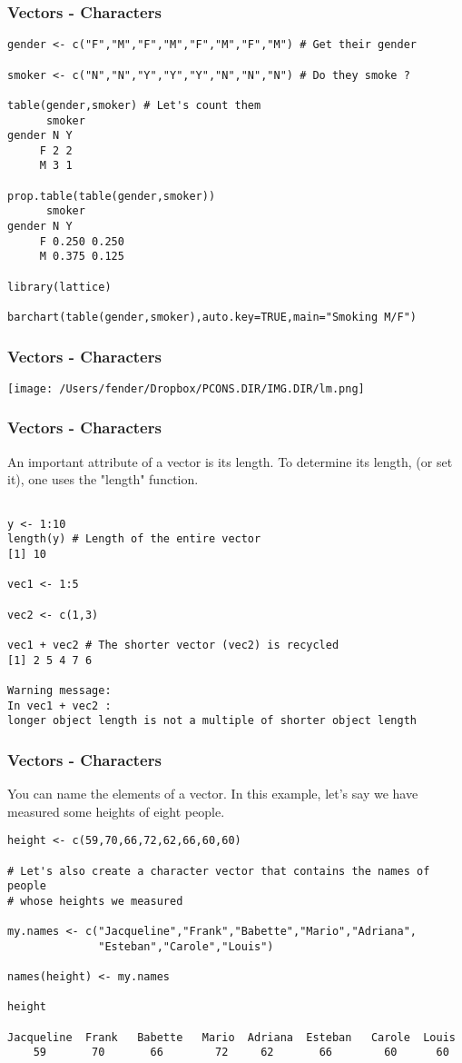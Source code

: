 \documentclass{beamer}
\begin{document}
% 

\begin{frame}[fragile]
\frametitle{Vectors - Characters}
\footnotesize
\begin{verbatim}
gender <- c("F","M","F","M","F","M","F","M") # Get their gender

smoker <- c("N","N","Y","Y","Y","N","N","N") # Do they smoke ?

table(gender,smoker) # Let's count them
      smoker
gender N Y
     F 2 2
     M 3 1
     
prop.table(table(gender,smoker))
      smoker
gender N Y
     F 0.250 0.250
     M 0.375 0.125

library(lattice)

barchart(table(gender,smoker),auto.key=TRUE,main="Smoking M/F")
\end{verbatim}
\end{frame}


\begin{frame}[fragile]
\frametitle{Vectors - Characters}
\begin{center}
\texttt{[image: /Users/fender/Dropbox/PCONS.DIR/IMG.DIR/lm.png]}
\end{center}
\end{frame}

%

\begin{frame}[fragile]
\frametitle{Vectors - Characters}
An important attribute of a vector is its length. To determine its length, (or set it), one
uses the "length" function.
\footnotesize
\begin{verbatim}

y <- 1:10
length(y) # Length of the entire vector
[1] 10

vec1 <- 1:5

vec2 <- c(1,3)

vec1 + vec2 # The shorter vector (vec2) is recycled
[1] 2 5 4 7 6

Warning message:
In vec1 + vec2 :
longer object length is not a multiple of shorter object length
\end{verbatim}
\end{frame}

%

\begin{frame}[fragile]
\frametitle{Vectors - Characters}
You can name the elements of a vector. In this example, let's say we have measured some heights of
eight people.
\scriptsize
\begin{verbatim}
height <- c(59,70,66,72,62,66,60,60)

# Let's also create a character vector that contains the names of people
# whose heights we measured

my.names <- c("Jacqueline","Frank","Babette","Mario","Adriana",
              "Esteban","Carole","Louis")

names(height) <- my.names

height

Jacqueline  Frank   Babette   Mario  Adriana  Esteban   Carole  Louis 
    59       70       66        72     62       66        60      60 
\end{verbatim}
\end{frame}
\end{document}
